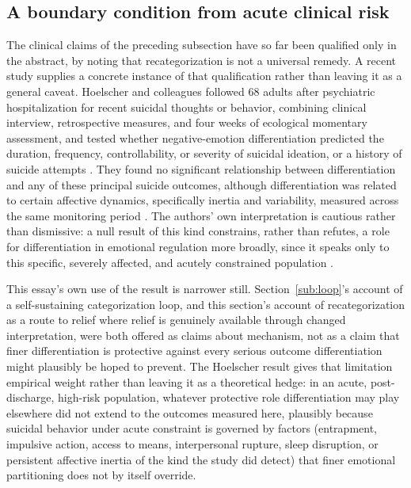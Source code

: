 \documentclass[11pt]{article}
\begin{document}
\subsection{A boundary condition from acute clinical risk}

The clinical claims of the preceding subsection have so far been qualified only in the abstract, by noting that recategorization is not a universal remedy. A recent study supplies a concrete instance of that qualification rather than leaving it as a general caveat. Hoelscher and colleagues followed 68 adults after psychiatric hospitalization for recent suicidal thoughts or behavior, combining clinical interview, retrospective measures, and four weeks of ecological momentary assessment, and tested whether negative-emotion differentiation predicted the duration, frequency, controllability, or severity of suicidal ideation, or a history of suicide attempts \citep{Hoelscher2026}. They found no significant relationship between differentiation and any of these principal suicide outcomes, although differentiation was related to certain affective dynamics, specifically inertia and variability, measured across the same monitoring period \citep{Hoelscher2026}. The authors' own interpretation is cautious rather than dismissive: a null result of this kind constrains, rather than refutes, a role for differentiation in emotional regulation more broadly, since it speaks only to this specific, severely affected, and acutely constrained population \citep{Hoelscher2026}.

This essay's own use of the result is narrower still. Section~\ref{sub:loop}'s account of a self-sustaining categorization loop, and this section's account of recategorization as a route to relief where relief is genuinely available through changed interpretation, were both offered as claims about mechanism, not as a claim that finer differentiation is protective against every serious outcome differentiation might plausibly be hoped to prevent. The Hoelscher result gives that limitation empirical weight rather than leaving it as a theoretical hedge: in an acute, post-discharge, high-risk population, whatever protective role differentiation may play elsewhere did not extend to the outcomes measured here, plausibly because suicidal behavior under acute constraint is governed by factors (entrapment, impulsive action, access to means, interpersonal rupture, sleep disruption, or persistent affective inertia of the kind the study did detect) that finer emotional partitioning does not by itself override.
\end{document}
